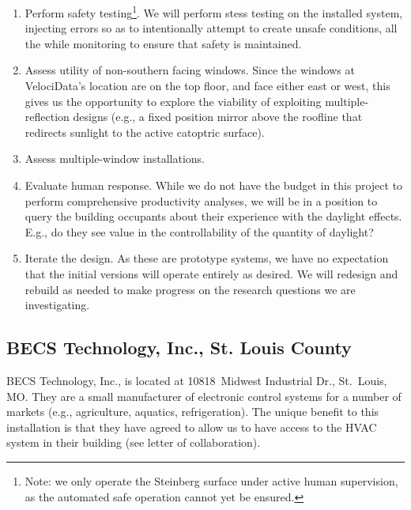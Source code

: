 \begin{enumerate}

\item Perform safety testing\footnote{Note: we only operate the Steinberg
surface under active human
supervision, as the automated safe operation cannot yet be ensured.}.
We will perform stess testing on the installed system, injecting errors so as to
intentionally attempt to create unsafe conditions, all the while monitoring
to ensure that safety is maintained.

\item Assess utility of non-southern facing windows.
Since the windows at VelociData's location are on the top floor, and face
either east or west, this gives us the opportunity to explore the viability
of exploiting multiple-reflection designs
(e.g., a fixed position mirror above the
roofline that redirects sunlight to the active catoptric surface).

\item Assess multiple-window installations.

\item Evaluate human response.
While we do not have the budget in this project to perform
comprehensive productivity analyses, we will be in a position to
query the building occupants about their experience with the
daylight effects. E.g., do they see value in the controllability
of the quantity of daylight?

\item Iterate the design.
As these are prototype systems, we have no expectation that the
initial versions will operate entirely as desired.  We will redesign
and rebuild as needed to make progress on the research questions we
are investigating.

\end{enumerate}

\subsection{BECS Technology, Inc., St. Louis County}

BECS Technology, Inc., is located at
10818~Midwest Industrial Dr., St.~Louis, MO.
They are a small manufacturer of electronic control
systems for a number of markets (e.g., agriculture, aquatics, refrigeration).
The unique benefit to this installation is that they have agreed to
allow us to have access to the HVAC system in their building (see letter
of collaboration).

